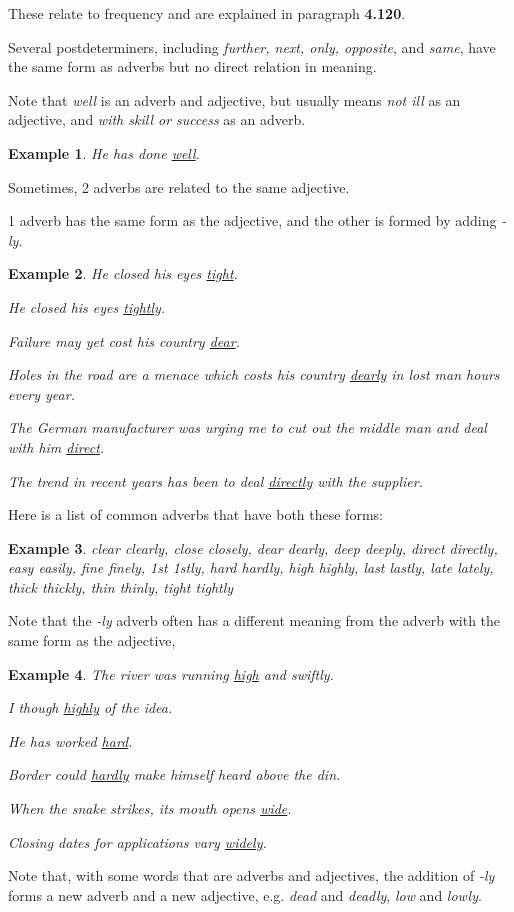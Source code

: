 \documentclass[oneside]{book}
\numberwithin{equation}{section}
\newtheorem{example}{Example}[section]
\begin{document}
These relate to frequency and are explained in paragraph \textbf{4.120}.

%
\noindent{} Several postdeterminers, including \textit{further, next, only, opposite}, and \textit{same}, have the same form as adverbs but no direct relation in meaning.

Note that \textit{well} is an adverb and adjective, but usually means \textit{not ill} as an adjective, and \textit{with skill or success} as an adverb.
\begin{example}
    He has done \underline{well}.
\end{example}
%
\noindent{} Sometimes, 2 adverbs are related to the same adjective.

1 adverb has the same form as the adjective, and the other is formed by adding \textit{-ly}.
\begin{example}
    He closed his eyes \underline{tight}.
    
    He closed his eyes \underline{tightly}.
    
    Failure may yet cost his country \underline{dear}.
    
    Holes in the road are a menace which costs his country \underline{dearly} in lost man hours every year.
    
    The German manufacturer was urging me to cut out the middle man and deal with him \underline{direct}.
    
    The trend in recent years has been to deal \underline{directly} with the supplier.
\end{example}
Here is a list of common adverbs that have both these forms:
\begin{example}
    clear clearly, close closely, dear dearly, deep deeply, direct directly, easy easily, fine finely, 1st 1stly, hard hardly, high highly, last lastly, late lately, thick thickly, thin thinly, tight tightly
\end{example}
Note that the \textit{-ly} adverb often has a different meaning from the adverb with the same form as the adjective,
\begin{example}
    The river was running \underline{high} and swiftly.
    
    I though \underline{highly} of the idea.
    
    He has worked \underline{hard}.
    
    Border could \underline{hardly} make himself heard above the din.
    
    When the snake strikes, its mouth opens \underline{wide}.
    
    Closing dates for applications vary \underline{widely}.
\end{example}
Note that, with some words that are adverbs and adjectives, the addition of \textit{-ly} forms a new adverb and a new adjective, e.g. \textit{dead} and \textit{deadly}, \textit{low} and \textit{lowly}.
\end{document}
